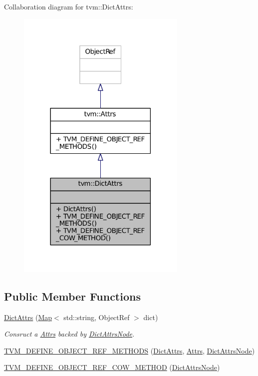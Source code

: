 Collaboration diagram for tvm\+:\+:Dict\+Attrs\+:
\nopagebreak
\begin{figure}[H]
\begin{center}
\leavevmode
\includegraphics[width=230pt]{classtvm_1_1DictAttrs__coll__graph}
\end{center}
\end{figure}
\subsection*{Public Member Functions}
\begin{DoxyCompactItemize}
\item 
\hyperlink{classtvm_1_1DictAttrs_a9a1c2ab8ebd3b2304f65a4c21856611e}{Dict\+Attrs} (\hyperlink{classtvm_1_1Map}{Map}$<$ std\+::string, Object\+Ref $>$ dict)
\begin{DoxyCompactList}\small\item\em Consruct a \hyperlink{classtvm_1_1Attrs}{Attrs} backed by \hyperlink{classtvm_1_1DictAttrsNode}{Dict\+Attrs\+Node}. \end{DoxyCompactList}\item 
\hyperlink{classtvm_1_1DictAttrs_a64c05cc1cf96bb2d876348a2721fa609}{T\+V\+M\+\_\+\+D\+E\+F\+I\+N\+E\+\_\+\+O\+B\+J\+E\+C\+T\+\_\+\+R\+E\+F\+\_\+\+M\+E\+T\+H\+O\+DS} (\hyperlink{classtvm_1_1DictAttrs}{Dict\+Attrs}, \hyperlink{classtvm_1_1Attrs}{Attrs}, \hyperlink{classtvm_1_1DictAttrsNode}{Dict\+Attrs\+Node})
\item 
\hyperlink{classtvm_1_1DictAttrs_adcb7e5ecede9d976bda30fb3f762c953}{T\+V\+M\+\_\+\+D\+E\+F\+I\+N\+E\+\_\+\+O\+B\+J\+E\+C\+T\+\_\+\+R\+E\+F\+\_\+\+C\+O\+W\+\_\+\+M\+E\+T\+H\+OD} (\hyperlink{classtvm_1_1DictAttrsNode}{Dict\+Attrs\+Node})
\end{DoxyCompactItemize}


